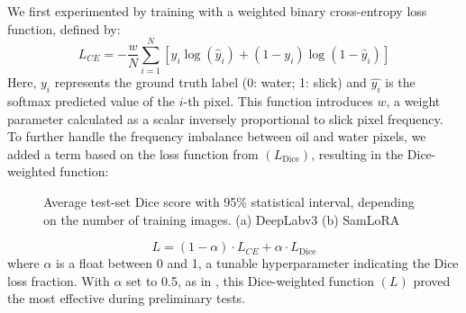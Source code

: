 \documentclass[lettersize,journal]{IEEEtran}
\begin{document}
We first experimented by training with a weighted binary cross-entropy loss function, defined by:
\begin{equation}
    L_\textit{CE} = -\frac{w}{N} \sum_{i=1}^{N} \left[ y_i \log(\hat{y}_i) + (1 - y_i) \log(1 - \hat{y}_i) \right]
\end{equation}
Here, \( y_i \) represents the ground truth label (0: water; 1: slick) and \( \hat{y_i}  \) is the softmax predicted value of the \( i \)-th pixel. This function introduces \( w \), a weight parameter 
calculated as a scalar inversely proportional to slick pixel frequency\cite{azadLossFunctionsEra2023}. To further handle the frequency imbalance between oil and water pixels, we added a term based on 
the loss function from \cite{milletariVNetFullyConvolutional2016} \( (L_\text{Dice}) \), resulting in the Dice-weighted function:
\begin{figure}[!t]
    \centering
    \hfil
    \caption{Average test-set Dice score with 95\% statistical interval, depending on the number of training images. \quad (a) DeepLabv3 \quad (b) SamLoRA }
    \label{figure2}
\end{figure}
\begin{equation}
    L = (1 - \alpha) \cdot L_\textit{CE} + \alpha \cdot L_\text{Dice}
\end{equation}
where $\alpha$ is a float between 0 and 1, a tunable hyperparameter indicating the Dice loss fraction. With $\alpha$ set to 0.5, as in \cite{taghanakiComboLossHandling2019}, 
this Dice-weighted function \( (L) \) proved the most effective during preliminary tests.
\end{document}
